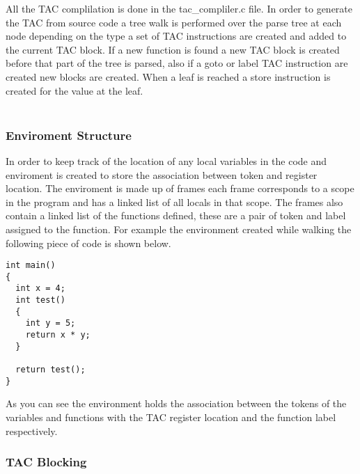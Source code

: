 \documentclass{article}
\begin{document}
All the TAC complilation is done in the tac\_compliler.c file.
In order to generate the TAC from source code a tree walk is performed over the
parse tree at each node depending on the type a set of TAC instructions are created
and added to the current TAC block. If a new function is found a new TAC block is
created before that part of the tree is parsed, also if a goto or label TAC instruction
are created new blocks are created. When a leaf is reached a store instruction is
created for the value at the leaf.\\~\\

\subsubsection{Enviroment Structure}

In order to keep track of the location of any local variables in the code and enviroment
is created to store the association between token and register location. The enviroment
is made up of frames each frame corresponds to a scope in the program and has
a linked list of all locals in that scope. The frames also contain a linked list of
the functions defined, these are a pair of token and label assigned to the function.
For example the environment created while walking the following piece of code is shown below.

\begin{lstlisting}
int main()
{
  int x = 4;
  int test()
  {
    int y = 5;
    return x * y;
  }

  return test();
}
\end{lstlisting}


As you can see the environment holds the association between the tokens of the variables
and functions with the TAC register location and the function label respectively.

\subsubsection{TAC Blocking}
\end{document}
